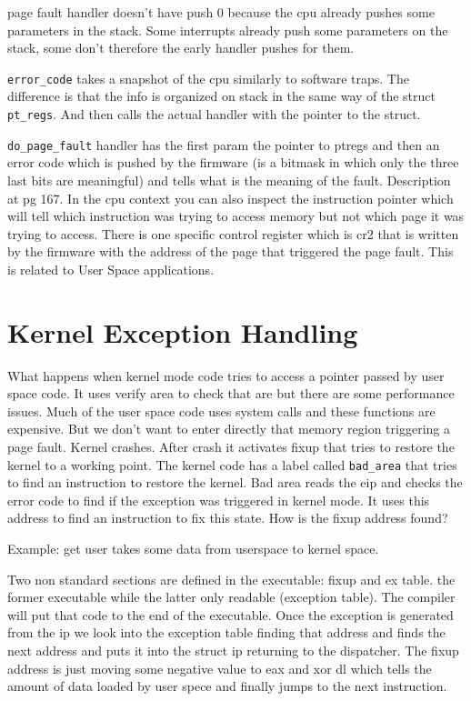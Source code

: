 \documentclass[twoside]{article}
\begin{document}
page fault handler doesn't have push 0 because the cpu already pushes some
parameters in the stack. Some interrupts already push some parameters on 
the stack, some don't therefore the early handler pushes for them.

\texttt{error_code} takes a snapshot of the cpu similarly to software traps. The
difference is that the info is organized on stack in the same way of the 
struct \texttt{pt_regs}. And then calls the actual handler with the pointer
to the struct.

\texttt{do_page_fault} handler has the first param the pointer to ptregs and
then an error code which is pushed by the firmware (is a bitmask in which
only the three last bits are meaningful) and tells what is the meaning of the
fault. Description at pg 167. In the cpu context you can also inspect the
instruction pointer which will tell which instruction was trying to access
memory but not which page it was trying to access. There is one specific
control register which is cr2 that is written by the firmware with the
address of the page that triggered the page fault. This is related to
User Space applications.

\section{Kernel Exception Handling}
\label{sec:Kernel Exception Handling}

What happens when kernel mode code tries to access a pointer passed by
user space code. It uses verify area to check that are but there are some
performance issues. Much of the user space code uses system calls and these
functions are expensive. But we don't want to enter directly that memory region
triggering a page fault. Kernel crashes. After crash it activates fixup that
tries to restore the kernel to a working point. The kernel code has a label called \texttt{bad_area} that tries to find an instruction to restore
the kernel. Bad area reads the eip and checks the error code to find 
if the exception was triggered in kernel mode. It uses this address to
find an instruction to fix this state. How is the fixup address found? 

Example: get user takes some data from userspace to kernel space.

Two non standard sections are defined in the executable: fixup and ex table.
the former executable while the latter only readable (exception table). The
compiler will put that code to the end of the executable. Once the exception
is generated from the ip we look into the exception table finding that
address and finds the next address and puts it into the struct ip returning
to the dispatcher. The fixup address is just moving some negative value
to eax and xor dl which tells the amount of data loaded by user spece and 
finally jumps to the next instruction. 
\end{document}

